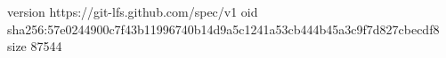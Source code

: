 version https://git-lfs.github.com/spec/v1
oid sha256:57e0244900c7f43b11996740b14d9a5c1241a53cb444b45a3c9f7d827cbecdf8
size 87544
